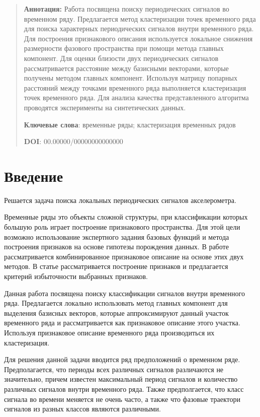 \documentclass[12pt, twoside]{article}
\begin{document}
{\centering\begin{quote}
\textbf{Аннотация:} Работа посвящена поиску периодических сигналов во временном ряду. Предлагается метод кластеризации точек временного ряда для поиска характерных периодических сигналов внутри временного ряда. Для построения признакового описания используется локальное снижения размерности фазового пространства при помощи метода главных компонент. Для оценки близости двух периодических сигналов рассматривается расстояние между базисными векторами, которые получены методом главных компонент. Используя матрицу попарных расстояний между точками временного ряда выполняется кластеризация точек временного ряда. Для анализа качества представленного алгоритма проводятся эксперименты на синтетических данных.


\smallskip
\textbf{Ключевые слова}: временные ряды; кластеризация временных рядов

\smallskip
\textbf{DOI}: 00.00000/00000000000000
\end{quote}
}

\section{Введение}
Решается задача поиска локальных периодических сигналов акселерометра.

Временные ряды это объекты сложной структуры, при классификации которых большую роль играет построение признакового пространства. Для этой цели возможно использование экспертного задания базовых функций и метода построения признаков на основе гипотезы порождения данных. В работе \cite{Ivkin2015} рассматривается комбинированное признаковое описание на основе этих двух методов. В статье \cite{Katrutsa2015} рассматривается построение признаков и предлагается критерий избыточности выбранных признаков.

Данная работа посвящена поиску классификации сигналов внутри временного ряда. Предлагается локально использовать метод главных компонент для выделения базисных векторов, которые аппроксимируют данный участок временного ряда и рассматривается как признаковое описание этого участка. Используя признаковое описание временного ряда производиться их кластеризация. 

Для решения данной задачи вводится ряд предположений о временном ряде. Предполагается, что периоды всех различных сигналов различаются не значительно, причем известен максимальный период сигналов и количество различных сигналов внутри временного ряда. Также предполгается, что класс сигнала во времени меняется не очень часто, а также что фазовые траектори сигналов из разных классов являются различными. 
\end{document}
